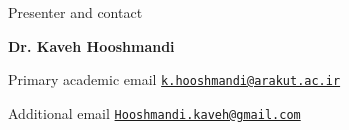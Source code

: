 \documentclass[aspectratio=169,10pt]{beamer}
\begin{document}
\begin{frame}{Presenter and contact}
  \begin{center}
    {\Large\bfseries Dr. Kaveh Hooshmandi}\par
  \end{center}
  \vspace{0.25cm}
  \begin{block}{Primary academic email}
    \href{mailto:k.hooshmandi@arakut.ac.ir}{\texttt{k.hooshmandi@arakut.ac.ir}}
  \end{block}
  \begin{block}{Additional email}
    \href{mailto:Hooshmandi.kaveh@gmail.com}{\texttt{Hooshmandi.kaveh@gmail.com}}
  \end{block}
\end{frame}
\end{document}
